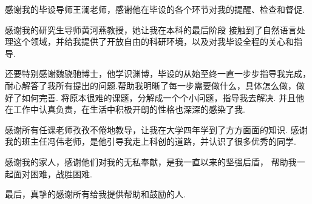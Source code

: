 \documentclass[bachelor,adobefonts]{jnuthesis}
\begin{document}
\begin{acknowledgement}
感谢我的毕设导师王澜老师，感谢他在毕设的各个环节对我的提醒、检查和督促.

感谢我的研究生导师黄河燕教授，她让我在本科的最后阶段
接触到了自然语言处理这个领域，并给我提供了开放自由的科研环境，以及对我毕设全程的关心和指导.

还要特别感谢魏骁驰博士，他学识渊博，毕设的从始至终一直一步步指导我完成，
耐心解答了我所有提出的问题.帮助我明晰了每一步需要做什么，具体怎么做，做好了如何完善.
将原本很难的课题，分解成一个个小问题，指导我去解决.
并且他在工作中认真负责，在生活中积极开朗的性格也深深的感染了我.

感谢所有任课老师孜孜不倦地教导，让我在大学四年学到了方方面面的知识.
感谢我的班主任冯伟老师，是他引导我走上科创的道路，并认识了很多优秀的同学.

感谢我的家人，感谢他们对我的无私奉献，是我一直以来的坚强后盾，
帮助我一起面对困难，战胜困难.

最后，真挚的感谢所有给我提供帮助和鼓励的人.
\end{acknowledgement}

\backmatter




\end{document}
